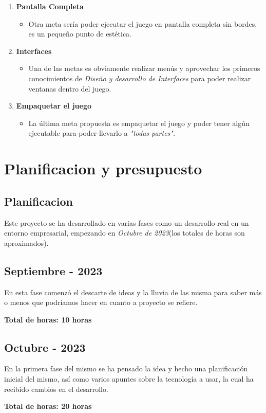 \documentclass[a4paper]{article}
\begin{document}
\begin{enumerate}
    \item \textbf{Pantalla Completa}
          \begin{itemize}
              \item Otra meta sería poder ejecutar el juego en pantalla completa sin bordes, es un pequeño punto de estética.
          \end{itemize}

    \item \textbf{Interfaces}
          \begin{itemize}
              \item Una de las metas es obviamente realizar menús y aprovechar los primeros conocimientos de \textit{Diseño y desarrollo de Interfaces} para poder realizar ventanas dentro del juego.
          \end{itemize}

    \item \textbf{Empaquetar el juego}
          \begin{itemize}
              \item La última meta propuesta es empaquetar el juego y poder tener algún ejecutable para poder llevarlo a \textit{"todas partes"}.
          \end{itemize}
\end{enumerate}

\clearpage
\section{Planificacion y presupuesto}
\subsection{Planificacion}
Este proyecto se ha desarrollado en varias fases como un desarrollo real en un entorno empresarial, empezando en \textit{Octubre de 2023}(los totales de horas son aproximados).
\subsection{Septiembre - 2023}
En esta fase comenzó el descarte de ideas y la lluvia de las misma para saber más o menos que podríamos hacer en cuanto a proyecto se refiere.
\begin{flushright}
    \bf Total de horas: 10 horas
\end{flushright}

\subsection{Octubre - 2023}
En la primera fase del mismo se ha pensado la idea y hecho una planificación inicial del mismo, así como varios apuntes sobre la tecnología a usar, la cual ha recibido cambios en el desarrollo.
\begin{flushright}
    \bf Total de horas: 20 horas
\end{flushright}
\end{document}
